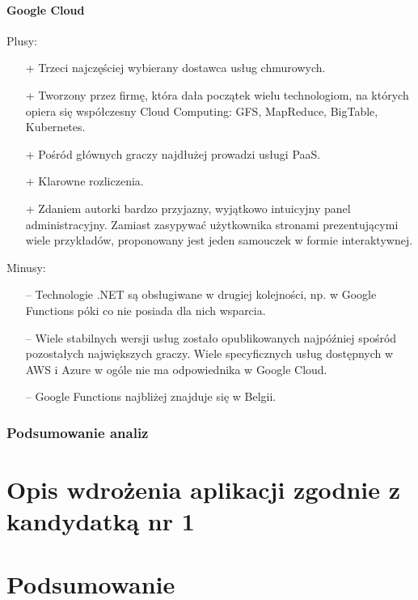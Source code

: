 \documentclass[12pt,a4paper,twoside,titlepage,openright]{book}
\begin{document}
\subsubsection{Google Cloud}

Plusy:
\begin{itemize}
\item[+] Trzeci najczęściej wybierany dostawca usług chmurowych.
\item[+] Tworzony przez firmę, która dała początek wielu technologiom, na których opiera się współczesny Cloud Computing: GFS, MapReduce, BigTable, Kubernetes.
\item[+] Pośród głównych graczy najdłużej prowadzi usługi PaaS.
\item[+] Klarowne rozliczenia.
\item[+] Zdaniem autorki bardzo przyjazny, wyjątkowo intuicyjny panel administracyjny. Zamiast zasypywać użytkownika stronami prezentującymi wiele przykładów, proponowany jest jeden samouczek w formie interaktywnej.
\end{itemize}

\noindent
Minusy:
\begin{itemize}
\item[--] Technologie .NET są obsługiwane w drugiej kolejności, np. w Google Functions póki co nie posiada dla nich wsparcia.
\item[--] Wiele stabilnych wersji usług zostało opublikowanych najpóźniej spośród pozostałych największych graczy. Wiele specyficznych usług dostępnych w AWS i Azure w ogóle nie ma odpowiednika w Google Cloud.
\item[--] Google Functions najbliżej znajduje się w Belgii.
\end{itemize}


\subsection{Podsumowanie analiz}





\chapter{Opis wdrożenia aplikacji zgodnie z kandydatką nr 1 }
 
\chapter*{Podsumowanie}
 
 
 
 
\listoffigures

\listoftables



\printbibliography
 
\end{document}
